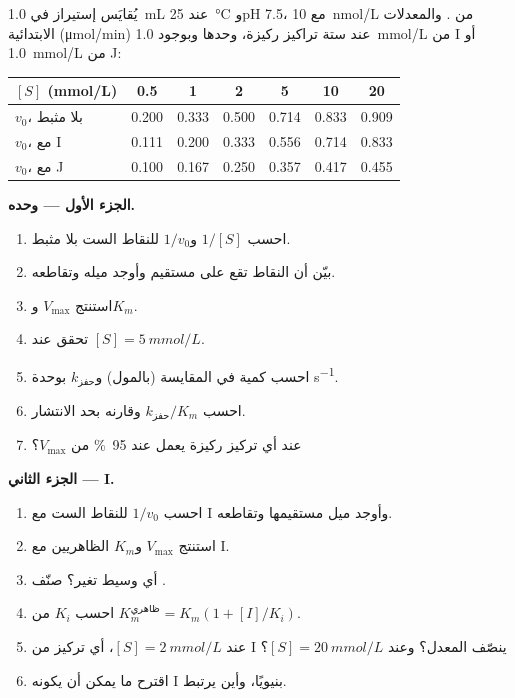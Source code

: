 \begin{problem}
\label{pb:b1:enzymes:1}
يُقايَس إستيراز في \qty{1.0}{mL} عند \qty{25}{\celsius} وpH 7.5، مع
\qty{10}{nmol/L} من . والمعدلات الابتدائية
(\unit{\micro mol/min}) عند ستة تراكيز ركيزة، وحدها وبوجود
\qty{1.0}{mmol/L} من  I أو \qty{1.0}{mmol/L} من  J:

\begin{center}
\small
\begin{tabular}{lcccccc}
\hline
$[S]$ (\unit{mmol/L}) & 0.5 & 1 & 2 & 5 & 10 & 20 \\
\hline
$v_0$، بلا مثبط & 0.200 & 0.333 & 0.500 & 0.714 & 0.833 & 0.909 \\
$v_0$، مع I & 0.111 & 0.200 & 0.333 & 0.556 & 0.714 & 0.833 \\
$v_0$، مع J & 0.100 & 0.167 & 0.250 & 0.357 & 0.417 & 0.455 \\
\hline
\end{tabular}
\end{center}

\medskip
\noindent\textbf{الجزء الأول ---  وحده.}
\begin{enumerate}
  \item احسب $1/[S]$ و$1/v_0$ للنقاط الست بلا مثبط.
  \item بيّن أن النقاط تقع على مستقيم وأوجد ميله وتقاطعه.
  \item استنتج $V_{\max}$ و$K_m$.
  \item تحقق  عند $[S] =
        \qty{5}{mmol/L}$.
  \item احسب كمية  في المقايسة (بالمول) و$k_{\text{حفز}}$
        بوحدة \unit{s^{-1}}.
  \item احسب $k_{\text{حفز}}/K_m$ وقارنه بحد الانتشار.
  \item عند أي تركيز ركيزة يعمل  عند \qty{95}{\%} من
        $V_{\max}$؟
\end{enumerate}

\medskip
\noindent\textbf{الجزء الثاني ---  I.}
\begin{enumerate}[resume]
  \item احسب $1/v_0$ للنقاط الست مع I وأوجد ميل مستقيمها وتقاطعه.
  \item استنتج $V_{\max}$ و$K_m$ الظاهريين مع I.
  \item أي وسيط تغير؟ صنّف .
  \item احسب $K_i$ من $K_m^{\text{ظاهري}} = K_m(1 + [I]/K_i)$.
  \item عند $[S] = \qty{2}{mmol/L}$، أي تركيز من I ينصّف المعدل؟
        وعند $[S] = \qty{20}{mmol/L}$؟
  \item اقترح ما يمكن أن يكونه I بنيويًا، وأين يرتبط.
\end{enumerate}


\end{problem}

